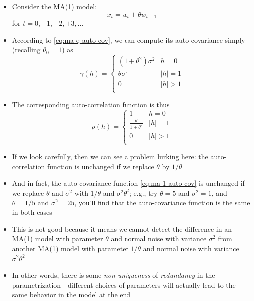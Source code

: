 \documentclass{article}
\begin{document}
\begin{itemize}
\item Consider the MA(1) model:
  \begin{equation}
  \label{eq:ma-1}
  x_t = w_t + \theta w_{t-1}
  \end{equation}
  for  $t = 0, \pm 1, \pm 2, \pm 3, \dots$ 

\item According to \eqref{eq:ma-q-auto-cov}, we can compute its auto-covariance 
  simply (recalling $\theta_0 = 1$) as
  \begin{equation}
  \label{eq:ma-1-auto-cov}  
  \gamma(h) = \begin{cases}
  (1+\theta^2) \sigma^2 & h = 0 \\
  \theta \sigma^2 & |h| = 1 \\
  0 & |h| > 1 \\
  \end{cases}
  \end{equation}

\item The corresponding auto-correlation function is thus
  \[
  \rho(h) = \begin{cases}
  1 & h = 0 \\
  \frac{\theta}{1+\theta^2} & |h| = 1 \\ 
  0 & |h| > 1 \\
  \end{cases}
  \]

\item If we look carefully, then we can see a problem lurking here: the
  auto-correlation function is unchanged if we replace $\theta$ by $1/\theta$

\item And in fact, the auto-covariance function \eqref{eq:ma-1-auto-cov} is
  unchanged if we replace $\theta$ and $\sigma^2$ with $1/\theta$ and $\sigma^2
  \theta^2$; e.g., try $\theta = 5$ and $\sigma^2 = 1$, and $\theta = 1/5$ and
  $\sigma^2 = 25$, you'll find that the auto-covariance function is the same in
  both cases 

\item This is not good because it means we cannot detect the difference in an
  MA(1) model with parameter $\theta$ and normal noise with variance $\sigma^2$ 
  from another MA(1) model with parameter $1/\theta$ and normal noise with
  variance $\sigma^2 \theta^2$

\item In other words, there is some \emph{non-uniqueness} of \emph{redundancy}
  in the parametrization---different choices of parameters will actually lead to
  the same behavior in the model at the end


\end{itemize}
\end{document}
